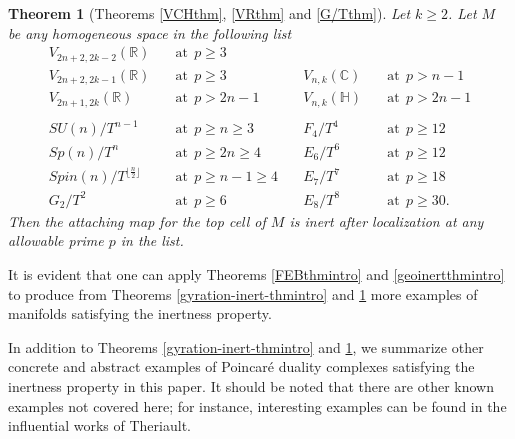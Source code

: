\documentclass[a4]{amsart}
\newtheorem{theorem}{Theorem}[section]
\theoremstyle{definition}
\begin{document}
\begin{sloppypar}
\begin{theorem}[Theorems \ref{VCHthm}, \ref{VRthm} and \ref{G/Tthm}]\label{homthmintro}
Let $k\geq 2$. Let $M$ be any homogeneous space in the following list 
\[
\begin{array}{llll} 
V_{2n+2, 2k-2}(\mathbb{R})& \quad\mbox{at}\ \ p\geq 3    \\
     V_{2n+2, 2k-1}(\mathbb{R}) & \quad\mbox{at}\ \ p\geq 3   & \quad V_{n,k}(\mathbb{C})   & \quad\mbox{at}\ \ p>n-1          \\
  V_{2n+1,2k}(\mathbb{R}) & \quad\mbox{at}\ \ p>2n-1    &\quad V_{n,k}(\mathbb{H})  & \quad\mbox{at}\ \ p>2n-1 \\   
  ~~~\\
   SU(n)/T^{n-1} & \quad\mbox{at}\  \ p\geq n\geq 3        &\quad F_4/T^4& \quad\mbox{at}\ \ p\geq 12 \\  
   Sp(n)/T^{n} & \quad\mbox{at}\ \ p\geq 2n\geq 4          & \quad E_6/T^6 & \quad\mbox{at}\ \ p\geq 12 \\ 
   Spin(n)/T^{\lfloor \frac{n}{2} \rfloor} & \quad\mbox{at}\ \ p\geq n-1\geq 4           & \quad E_7/T^7 & \quad\mbox{at}\ \ p\geq 18 \\
   G_2/T^2 & \quad\mbox{at}\ \ p\geq 6                         & \quad E_8/T^8 & \quad\mbox{at}\ \ p\geq 30.
\end{array} 
\]
Then the attaching map for the top cell of $M$ is inert after localization at any allowable prime $p$ in the list. 
\end{theorem}
It is evident that one can apply Theorems \ref{FEBthmintro} and \ref{geoinertthmintro} to produce from Theorems \ref{gyration-inert-thmintro} and \ref{homthmintro} more examples of manifolds satisfying the inertness property. 

In addition to Theorems \ref{gyration-inert-thmintro} and \ref{homthmintro}, we summarize other concrete and abstract examples of Poincar\'{e} duality complexes satisfying the inertness property in this paper. It should be noted that there are other known examples not covered here; for instance, interesting examples can be found in the influential works \cite{The24a, The24b} of Theriault.



\end{sloppypar}
\end{document}
